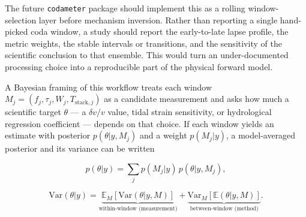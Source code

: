 \documentclass[12pt]{article}
\begin{document}
The future \texttt{codameter} package should implement this as a rolling
window-selection layer before mechanism inversion. Rather than reporting
a single hand-picked coda window, a study should report the
early-to-late lapse profile, the metric weights, the stable intervals or
transitions, and the sensitivity of the scientific conclusion to that
ensemble. This would turn an under-documented processing choice into a
reproducible part of the physical forward model.

A Bayesian framing of this workflow treats each window
\(M_j=(f_j,\tau_j,W_j,T_{\mathrm{stack},j})\) as a candidate measurement
and asks how much a scientific target \(\theta\) --- a \(\delta v/v\)
value, tidal strain sensitivity, or hydrological regression coefficient
--- depends on that choice. If each window yields an estimate with
posterior \(p(\theta|y,M_j)\) and a weight \(p(M_j|y)\), a
model-averaged posterior and its variance can be written

\[p(\theta|y)=\sum_j p(M_j|y)\,p(\theta|y,M_j), \tag{17}\]

\[\mathrm{Var}(\theta|y)=\underbrace{\mathbb{E}_{M}[\mathrm{Var}(\theta|y,M)]}_{\text{within-window (measurement)}}+\underbrace{\mathrm{Var}_{M}[\mathbb{E}(\theta|y,M)]}_{\text{between-window (method)}}. \tag{18}\]
\end{document}
